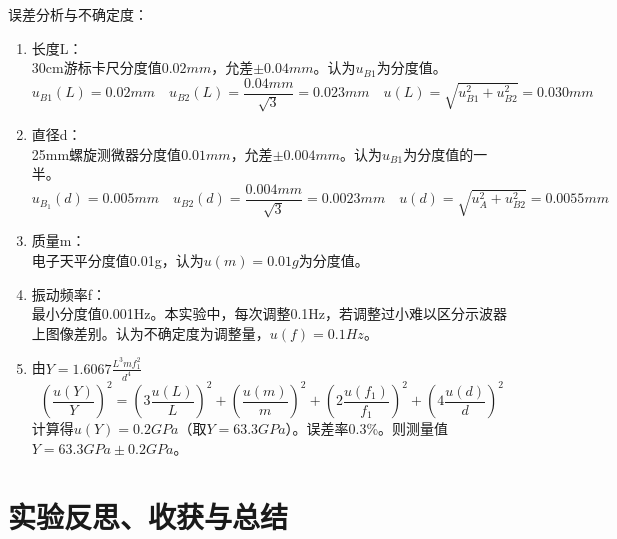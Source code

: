 \documentclass[11pt]{article}
\begin{document}
\par \noindent 误差分析与不确定度：
\begin{enumerate}
    \item 长度L：
    \\ 30cm游标卡尺分度值$0.02mm$，允差$\pm 0.04mm$。认为$u_{B1}$为分度值。
    \[u_{B1}(L)=0.02mm\quad u_{B2}(L)=\frac{0.04mm}{\sqrt{3}}=0.023mm\quad u(L)=\sqrt{u_{B1}^2+u_{B2}^2}=0.030mm\]
    \item 直径d：
    \\ 25mm螺旋测微器分度值$0.01mm$，允差$\pm 0.004mm$。认为$u_{B1}$为分度值的一半。
    \[u_{B_1}(d)=0.005mm\quad u_{B2}(d)=\frac{ 0.004mm}{\sqrt{3}}=0.0023mm\quad u(d)=\sqrt{u_A^2+u_{B2}^2}=0.0055mm\]
    \item 质量m：
    \\ 电子天平分度值0.01g，认为$u(m)=0.01g$为分度值。
    \item 振动频率f：
    \\ 最小分度值0.001Hz。本实验中，每次调整0.1Hz，若调整过小难以区分示波器上图像差别。认为不确定度为调整量，$u(f)=0.1Hz$。
    \item 由$Y=1.6067\frac{L^3mf_1^2}{d^4}$
    \[{\left(\frac{u(Y)}{Y}\right)}^2={\left(3\frac{u(L)}{L}\right)}^2+{\left(\frac{u(m)}{m}\right)}^2+{\left(2\frac{u(f_1)}{f_1}\right)}^2+{\left(4\frac{u(d)}{d}\right)}^2\]
    计算得$u(Y)=0.2GPa$（取$Y=63.3GPa$）。误差率0.3\%。则测量值$Y=63.3GPa \pm 0.2GPa$。
\end{enumerate}



\section{实验反思、收获与总结}
\end{document}
